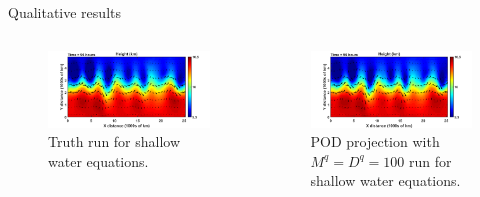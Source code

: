 \documentclass[aspectratio=169]{beamer}
\begin{document}

\begin{frame}{Qualitative results}
    \begin{columns}
    \begin{column}{.49\textwidth}
\begin{figure}[H]
\centering
\includegraphics[width=\textwidth]{figures/swe_truth.png}
\caption{Truth run for shallow water equations.}
\end{figure}
    \end{column}

 \begin{column}{.49\textwidth}
\begin{figure}[H]
\centering
\includegraphics[width=\textwidth]{figures/swe_pod10.png}
\caption{POD projection with $M^q=D^q=100$ run for shallow water equations.}
\end{figure}
 \end{column}
\end{columns}
\end{frame}

\end{document}
